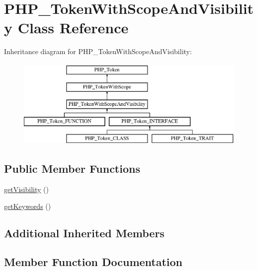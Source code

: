\hypertarget{class_p_h_p___token_with_scope_and_visibility}{}\section{P\+H\+P\+\_\+\+Token\+With\+Scope\+And\+Visibility Class Reference}
\label{class_p_h_p___token_with_scope_and_visibility}
Inheritance diagram for P\+H\+P\+\_\+\+Token\+With\+Scope\+And\+Visibility\+:\begin{figure}[H]
\begin{center}
\leavevmode
\includegraphics[height=4.320988cm]{class_p_h_p___token_with_scope_and_visibility}
\end{center}
\end{figure}
\subsection*{Public Member Functions}
\begin{DoxyCompactItemize}
\item 
\mbox{\hyperlink{class_p_h_p___token_with_scope_and_visibility_a292b98b1e11ce740774e4d99a8276904}{get\+Visibility}} ()
\item 
\mbox{\hyperlink{class_p_h_p___token_with_scope_and_visibility_a6f99615aae20ffeb2cc8c384a2ec353a}{get\+Keywords}} ()
\end{DoxyCompactItemize}
\subsection*{Additional Inherited Members}


\subsection{Member Function Documentation}
\mbox{\label{class_p_h_p___token_with_scope_and_visibility_a6f99615aae20ffeb2cc8c384a2ec353a}} 
